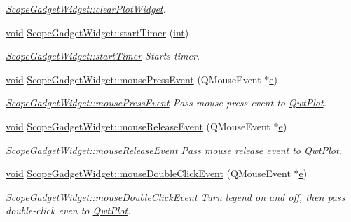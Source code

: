\begin{DoxyCompactItemize}
\begin{DoxyCompactList}\small\item\em \hyperlink{group__scopeplugin_ga9a19de9754adbab7df27b7db75348346}{Scope\-Gadget\-Widget\-::clear\-Plot\-Widget}. \end{DoxyCompactList}\item 
\hyperlink{group___u_a_v_objects_plugin_ga444cf2ff3f0ecbe028adce838d373f5c}{void} \hyperlink{group__scopeplugin_gaf8b41e32e96d357706a0c2a04d63e40c}{Scope\-Gadget\-Widget\-::start\-Timer} (\hyperlink{ioapi_8h_a787fa3cf048117ba7123753c1e74fcd6}{int})
\begin{DoxyCompactList}\small\item\em \hyperlink{group__scopeplugin_gaf8b41e32e96d357706a0c2a04d63e40c}{Scope\-Gadget\-Widget\-::start\-Timer} Starts timer. \end{DoxyCompactList}\item 
\hyperlink{group___u_a_v_objects_plugin_ga444cf2ff3f0ecbe028adce838d373f5c}{void} \hyperlink{group__scopeplugin_ga11281413c7e13a020d557822db2eaae2}{Scope\-Gadget\-Widget\-::mouse\-Press\-Event} (Q\-Mouse\-Event $\ast$\hyperlink{_o_p_plots_8m_a9425be9aab51621e317ba7ade564b570}{e})
\begin{DoxyCompactList}\small\item\em \hyperlink{group__scopeplugin_ga11281413c7e13a020d557822db2eaae2}{Scope\-Gadget\-Widget\-::mouse\-Press\-Event} Pass mouse press event to \hyperlink{class_qwt_plot}{Qwt\-Plot}. \end{DoxyCompactList}\item 
\hyperlink{group___u_a_v_objects_plugin_ga444cf2ff3f0ecbe028adce838d373f5c}{void} \hyperlink{group__scopeplugin_ga079408e64c98a63ff0459120988360e7}{Scope\-Gadget\-Widget\-::mouse\-Release\-Event} (Q\-Mouse\-Event $\ast$\hyperlink{_o_p_plots_8m_a9425be9aab51621e317ba7ade564b570}{e})
\begin{DoxyCompactList}\small\item\em \hyperlink{group__scopeplugin_ga079408e64c98a63ff0459120988360e7}{Scope\-Gadget\-Widget\-::mouse\-Release\-Event} Pass mouse release event to \hyperlink{class_qwt_plot}{Qwt\-Plot}. \end{DoxyCompactList}\item 
\hyperlink{group___u_a_v_objects_plugin_ga444cf2ff3f0ecbe028adce838d373f5c}{void} \hyperlink{group__scopeplugin_ga6b657bc6aec409845f48f29bb6fb508d}{Scope\-Gadget\-Widget\-::mouse\-Double\-Click\-Event} (Q\-Mouse\-Event $\ast$\hyperlink{_o_p_plots_8m_a9425be9aab51621e317ba7ade564b570}{e})
\begin{DoxyCompactList}\small\item\em \hyperlink{group__scopeplugin_ga6b657bc6aec409845f48f29bb6fb508d}{Scope\-Gadget\-Widget\-::mouse\-Double\-Click\-Event} Turn legend on and off, then pass double-\/click even to \hyperlink{class_qwt_plot}{Qwt\-Plot}. \end{DoxyCompactList}\item 

\end{DoxyCompactItemize}
